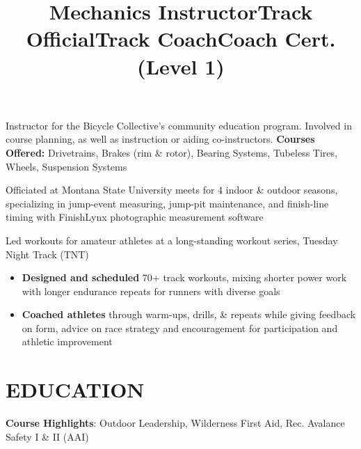 \documentclass[resmargin, centered, 10pt]{../res}
\begin{document}
\begin{resume}
\title{Mechanics Instructor}
\begin{position}
	Instructor for the Bicycle Collective's community education program. Involved in course planning, as well as instruction or aiding co-instructors. \textbf{Courses Offered:} Drivetrains, Brakes (rim \& rotor), Bearing Systems, Tubeless Tires, Wheels, Suspension Systems
\end{position}

\title{Track Official}
\begin{position}
	Officiated at Montana State University meets for 4 indoor \& outdoor seasons, specializing in jump-event measuring, jump-pit maintenance, and finish-line timing with FinishLynx photographic measurement software
\end{position}

\title{Track Coach}
\begin{position}
	Led workouts for amateur athletes at a long-standing workout series, Tuesday Night Track (TNT) \\
	\begin{itemize}
		\item \textbf{Designed and scheduled} 70+ track workouts, mixing shorter power work with longer endurance repeats for runners with diverse goals
		\item \textbf{Coached athletes} through warm-ups, drills, \& repeats while giving feedback on form, advice on race strategy and encouragement for participation and athletic improvement
	\end{itemize}
\end{position}

\fullline

\section{EDUCATION}

\textbf{Course Highlights}: Outdoor Leadership, Wilderness First Aid, Rec. Avalance Safety I \& II (AAI)

\title{Coach Cert. (Level 1)}
\begin{position}
\end{position}


\end{resume}
\end{document}
